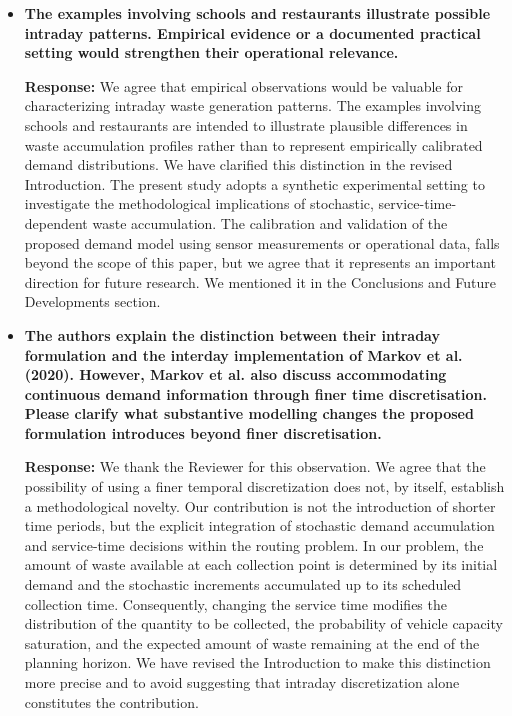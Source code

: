 \documentclass[11pt]{article}
\begin{document}
\begin{enumerate}
\begin{itemize}
\item \textbf{The examples involving schools and restaurants illustrate possible intraday patterns.
Empirical evidence or a documented practical setting would strengthen their operational relevance.}




\noindent\textbf{Response:} We agree that empirical observations would be valuable for characterizing intraday waste generation patterns. The examples involving schools and restaurants are intended to illustrate plausible differences in waste accumulation profiles rather than to represent empirically calibrated demand distributions. We have clarified this distinction in the revised Introduction. The present study adopts a synthetic experimental setting to investigate the methodological implications of stochastic, service-time-dependent waste accumulation. The calibration and validation of the proposed demand model using sensor measurements or operational data, falls beyond the scope of this paper, but we agree that it represents an important direction for future research. We mentioned it in the Conclusions and Future Developments section.


\item \textbf{The authors explain the distinction between their intraday formulation and the interday
implementation of Markov et al. (2020). However, Markov et al. also discuss accommodating continuous demand information through finer time discretisation. Please clarify what substantive modelling changes the proposed formulation introduces beyond
finer discretisation.}


\noindent\textbf{Response:} We thank the Reviewer for this observation. We agree that the possibility of using a finer temporal discretization does not, by itself, establish a methodological novelty. Our contribution is not the introduction of shorter time periods, but the explicit integration of stochastic demand accumulation and service-time decisions within the routing problem. In our problem, the amount of waste available at each collection point is determined by its initial demand and the stochastic increments accumulated up to its scheduled collection time. Consequently, changing the service time modifies the distribution of the quantity to be collected, the probability of vehicle capacity saturation, and the expected amount of waste remaining at the end of the planning horizon. We have revised the Introduction to make this distinction more precise and to avoid suggesting that intraday discretization alone constitutes the contribution.






\end{itemize}
\end{enumerate}
\end{document}
